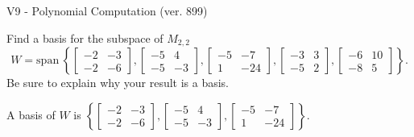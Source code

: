 \begin{exercise}
  \begin{exerciseTitle}V9 - Polynomial Computation (ver. 899)\end{exerciseTitle}
  \begin{exerciseStatement}
    Find a basis for the subspace of \(M_{2,2}\) 
\[W=\mathrm{span}\ \left\{\left[\begin{array}{cc}
-2 & -3 \\
-2 & -6
\end{array}\right] , \left[\begin{array}{cc}
-5 & 4 \\
-5 & -3
\end{array}\right] , \left[\begin{array}{cc}
-5 & -7 \\
1 & -24
\end{array}\right] , \left[\begin{array}{cc}
-3 & 3 \\
-5 & 2
\end{array}\right] , \left[\begin{array}{cc}
-6 & 10 \\
-8 & 5
\end{array}\right]\right\}.\]
 Be sure to explain why your result is a basis.


  \end{exerciseStatement}
  \begin{exerciseAnswer}
   A basis of \(W\) is  \(\left\{\left[\begin{array}{cc}
-2 & -3 \\
-2 & -6
\end{array}\right] , \left[\begin{array}{cc}
-5 & 4 \\
-5 & -3
\end{array}\right] , \left[\begin{array}{cc}
-5 & -7 \\
1 & -24
\end{array}\right]\right\}\).
  


  \end{exerciseAnswer}
\end{exercise}